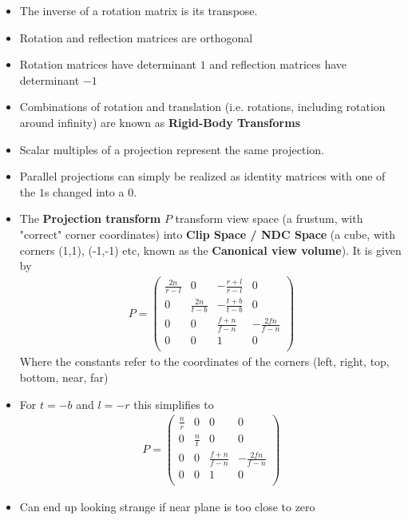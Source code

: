 \documentclass{scrartcl}
\begin{document}
\begin{itemize}
    \item The inverse of a rotation matrix is its transpose.
    \item Rotation and reflection matrices are orthogonal
    \item Rotation matrices have determinant $1$ and reflection matrices have determinant $-1$
    \item Combinations of rotation and translation (i.e. rotations, including rotation around infinity) are known as \textbf{Rigid-Body Transforms}
    \item Scalar multiples of a projection represent the same projection.
    \item Parallel projections can simply be realized as identity matrices with one of the $1$s changed into a $0$.
    \item The \textbf{Projection transform} $P$ transform view space (a frustum, with "correct" corner coordinates) into \textbf{Clip Space / NDC Space} (a cube, with corners (1,1), (-1,-1) etc, known as the \textbf{Canonical view volume}). It is given by
    \begin{align*}
        P = 
        \begin{pmatrix}
            \frac{2n}{r-l} & 0 & -\frac{r+l}{r-l} & 0\\
            0 & \frac{2n}{t-b} & -\frac{t+b}{t-b} & 0\\
            0 & 0 & \frac{f+n}{f-n} & -\frac{2fn}{f-n}\\
            0 & 0 & 1 & 0\\
        \end{pmatrix}
    \end{align*}
    Where the constants refer to the coordinates of the corners (left, right, top, bottom, near, far)
    \item For $t = -b$ and $l = -r$ this simplifies to
    \begin{align*}
        P = 
        \begin{pmatrix}
            \frac{n}{r} & 0 & 0 & 0\\
            0 & \frac{n}{t} & 0 & 0\\
            0 & 0 & \frac{f+n}{f-n} & -\frac{2fn}{f-n}\\
            0 & 0 & 1 & 0\\
        \end{pmatrix}
    \end{align*}
    \item Can end up looking strange if near plane is too close to zero
\end{itemize}
\end{document}
